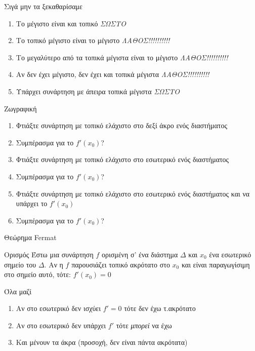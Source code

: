 \documentclass{presentation}
\begin{document}
\begin{frame}{Σιγά μην τα ξεκαθαρίσαμε}
    \begin{enumerate}
        \item<1-> Το μέγιστο είναι και τοπικό  {\emph{ΣΩΣΤΟ}}
        \item<3-> Το τοπικό μέγιστο είναι το μέγιστο  {\emph{ΛΑΘΟΣ!!!!!!!!!!}}
        \item<5-> Το μεγαλύτερο από τα τοπικά μέγιστα είναι το μέγιστο  {\emph{ΛΑΘΟΣ!!!!!!!!!!}}
        \item<7-> Αν δεν έχει μέγιστο, δεν έχει και τοπικά μέγιστα  {\emph{ΛΑΘΟΣ!!!!!!!!!!}}
        \item<9-> Υπάρχει συνάρτηση με άπειρα τοπικά μέγιστα  {\emph{ΣΩΣΤΟ}}
    \end{enumerate}
\end{frame}

\begin{frame}{Ζωγραφική}
    \begin{enumerate}
        \item<1-> Φτιάξτε συνάρτηση με τοπικό ελάχιστο στο δεξί άκρο ενός διαστήματος
        \item<2-> Συμπέρασμα για το $f'(x_0)$?
        \item<3-> Φτιάξτε συνάρτηση με τοπικό ελάχιστο στο εσωτερικό ενός διαστήματος
        \item<4-> Συμπέρασμα για το $f'(x_0)$?
        \item<5-> Φτιάξτε συνάρτηση με τοπικό ελάχιστο στο εσωτερικό ενός διαστήματος και να υπάρχει το $f'(x_0)$
        \item<6-> Συμπέρασμα για το $f'(x_0)$?
    \end{enumerate}
\end{frame}

\begin{frame}[label=Θεώρημα1]{Θεώρημα Fermat}
    \begin{block}{Ορισμός}
        Έστω μια συνάρτηση $f$ ορισμένη σ’ ένα διάστημα $Δ$ και $x_0$ ένα εσωτερικό σημείο του $Δ$. Αν η $f$ παρουσιάζει τοπικό ακρότατο στο $x_0$ και είναι παραγωγίσιμη στο σημείο αυτό, τότε:
        $f'(x_0) = 0$
    \end{block}

    \hyperlink{Απόδειξη1}{}
\end{frame}

\begin{frame}{Όλα μαζί}
    \begin{enumerate}
        \item<1-> Αν στο εσωτερικό δεν ισχύει $f'=0$ τότε δεν έχω τ.ακρότατο
        \item<2-> Αν στο εσωτερικό δεν υπάρχει $f'$ τότε \emph{μπορεί} να έχω
        \item<3-> Και μένουν τα άκρα (προσοχή, δεν είναι πάντα ακρότατα)
    \end{enumerate}
\end{frame}
\end{document}
